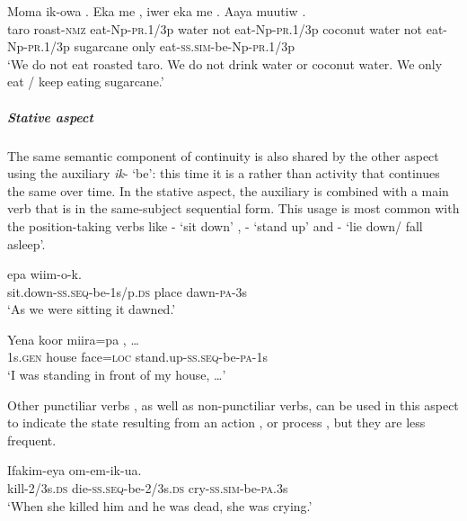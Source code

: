 \ea%
\label{ex:3:x1049}
\gll Moma ik-owa . Eka me , iwer eka me . Aaya muutiw .\\
taro roast-\textsc{nmz} eat-Np-\textsc{pr}.1/3p water not eat-Np-\textsc{pr}.1/3p coconut water not eat-Np-\textsc{pr}.1/3p sugarcane only eat-\textsc{ss}.\textsc{sim}-be-Np-\textsc{pr}.1/3p\\
\glt`We do not eat roasted taro. We do not drink water or coconut water. We only eat / keep eating sugarcane.'
\z

\subparagraph{Stative aspect} \label{sec:3.8.5.1.1.3}

The same semantic component of continuity is also shared by the other aspect using the auxiliary \textit{ik}- `be': this time it is a  rather than activity that continues the same over time. In the stative aspect, the auxiliary is combined with a main verb that is in the same-subject sequential form. This usage is most common with the position-taking verbs like - `sit down' , - `stand up'  and - `lie down/ fall asleep'.

\ea%
\label{ex:3:x356}
\gll {}  epa wiim-o-k. \\
sit.down-\textsc{ss}.\textsc{seq}-be-1s/p.\textsc{ds} place dawn-\textsc{pa}-3s \\
\glt`As we were sitting it dawned.'
\z

\ea%
\label{ex:3:x1046}
\gll Yena koor miira=pa , {\dots} \\
1s.\textsc{gen} house face=\textsc{loc} stand.up-\textsc{ss}.\textsc{seq}-be-\textsc{pa}-1s\\
\glt`I was standing in front of my house, {\dots}'
\z

Other punctiliar verbs , as well as non-punctiliar verbs, can be used in this aspect to indicate the state resulting from an action , or process , but they are less frequent.

\ea%
\label{ex:3:x357}
\gll Ifakim-eya   om-em-ik-ua. \\
kill-2/3s.\textsc{ds} die-\textsc{ss}.\textsc{seq}-be-2/3s.\textsc{ds} cry-\textsc{ss}.\textsc{sim}-be-\textsc{pa}.3s\\
\glt`When she killed him and he was dead, she was crying.'
\z

